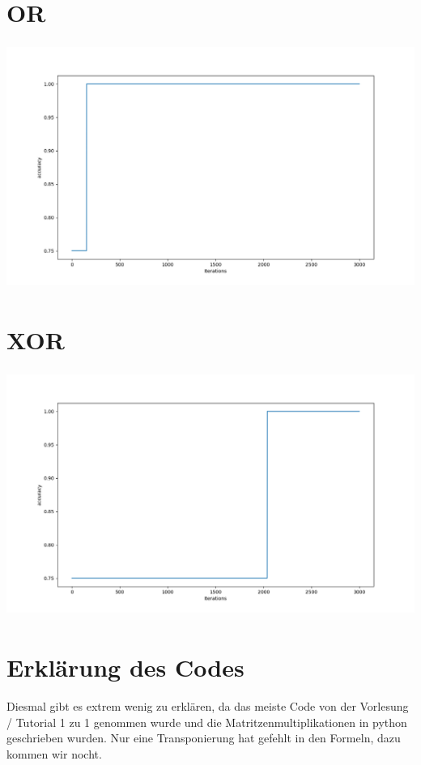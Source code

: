 \section*{OR}

\includegraphics[height=8cm]{./nn_or.png}

\section*{XOR}

\includegraphics[height=8cm]{./nn_xor.png}


\section*{Erklärung des Codes}
Diesmal gibt es extrem wenig zu erklären, da das meiste Code von der Vorlesung / Tutorial
1 zu 1 genommen wurde und die Matritzenmultiplikationen in python geschrieben wurden. Nur eine Transponierung
hat gefehlt in den Formeln, dazu kommen wir nocht.

